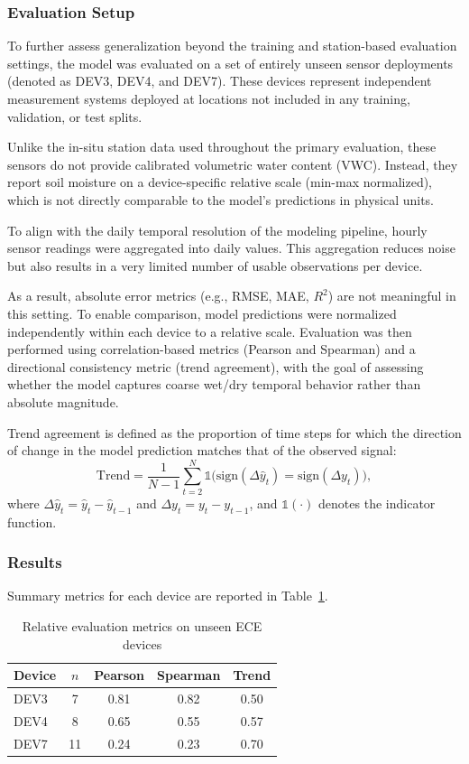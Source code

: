 \subsubsection*{Evaluation Setup}
To further assess generalization beyond the training and station-based evaluation settings, the model was evaluated on a set of entirely unseen sensor deployments (denoted as DEV3, DEV4, and DEV7). These devices represent independent measurement systems deployed at locations not included in any training, validation, or test splits.

Unlike the in-situ station data used throughout the primary evaluation, these sensors do not provide calibrated volumetric water content (VWC). Instead, they report soil moisture on a device-specific relative scale (min-max normalized), which is not directly comparable to the model's predictions in physical units.

To align with the daily temporal resolution of the modeling pipeline, hourly sensor readings were aggregated into daily values. This aggregation reduces noise but also results in a very limited number of usable observations per device.

As a result, absolute error metrics (e.g., RMSE, MAE, $R^2$) are not meaningful in this setting. To enable comparison, model predictions were normalized independently within each device to a relative scale. Evaluation was then performed using correlation-based metrics (Pearson and Spearman) and a directional consistency metric (trend agreement), with the goal of assessing whether the model captures coarse wet/dry temporal behavior rather than absolute magnitude.

Trend agreement is defined as the proportion of time steps for which the direction of change in the model prediction matches that of the observed signal:
\[
\text{Trend} = \frac{1}{N-1} \sum_{t=2}^{N} \mathds{1}\big(\text{sign}(\Delta \hat{y}_t) = \text{sign}(\Delta y_t)\big),
\]
where $\Delta \hat{y}_t = \hat{y}_t - \hat{y}_{t-1}$ and $\Delta y_t = y_t - y_{t-1}$, and $\mathds{1}(\cdot)$ denotes the indicator function.

\subsubsection*{Results}
Summary metrics for each device are reported in Table~\ref{tab:ece_results}.

\begin{table}[H]
\centering
\caption{Relative evaluation metrics on unseen ECE devices}
\label{tab:ece_results}
\begin{tabular}{lcccc}
\toprule
Device & $n$ & Pearson & Spearman & Trend \\
\midrule
DEV3 & 7  & 0.81 & 0.82 & 0.50 \\
DEV4 & 8  & 0.65 & 0.55 & 0.57 \\
DEV7 & 11 & 0.24 & 0.23 & 0.70 \\
\bottomrule
\end{tabular}
\end{table}

